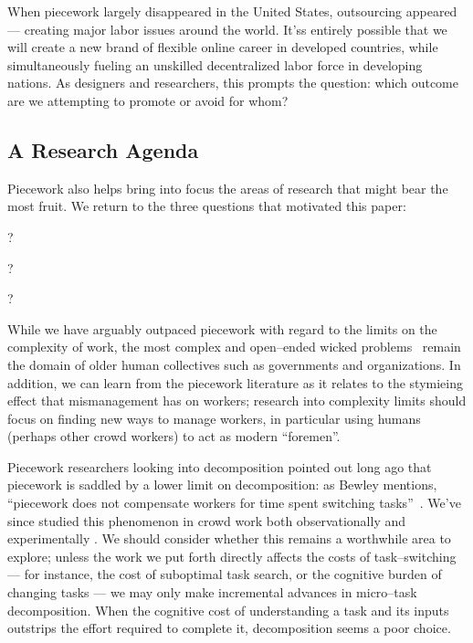 \documentclass[pn4226]{subfiles}
\begin{document}
When piecework largely disappeared in the United States, outsourcing appeared --- creating major labor issues around the world.
It'ss entirely possible that we will create a new brand of flexible online career in developed countries,
while simultaneously fueling an unskilled decentralized labor force in developing nations.
As designers and researchers, this prompts the question: which outcome are we attempting to promote or avoid for whom?


\subsection{A Research Agenda}\label{sec:whatShouldBeTheFuture}
Piecework also helps bring into focus the
areas of research that might bear the most fruit.
We return to the three questions that motivated this paper:
\begin{inlinelist}
  \item {}?
  \item {}?
  \item {}?
\end{inlinelist}

While we have arguably outpaced piecework with regard to the limits on the complexity of work,
the most complex and open--ended wicked problems~\cite{rittel1973dilemmas} remain the domain of older human collectives such as governments and organizations. 
In addition, we can learn from the piecework literature as it relates to
the stymieing effect that mismanagement has on workers;
research into complexity limits should focus on finding new ways to manage workers,
in particular using humans (perhaps other crowd workers)
to act as modern ``foremen''.

Piecework researchers looking into decomposition pointed out long ago that
piecework is saddled by a lower limit on decomposition:
as Bewley mentions,
``piecework does not compensate workers for time spent switching tasks''~\cite{bewley1999wages}. 
We've since studied this phenomenon in crowd work both
observationally \cite{taskSearch} and
experimentally \cite{delayAndOrderLasecki}.
We should consider whether this remains a worthwhile area to explore;
unless the work we put forth directly affects the costs of task--switching
--- for instance, the cost of suboptimal task search, or the cognitive burden of changing tasks ---
we may only make incremental advances in micro--task decomposition.
When the cognitive cost of understanding a task and its inputs outstrips the effort required to complete it, decomposition seems a poor choice.
\end{document}
